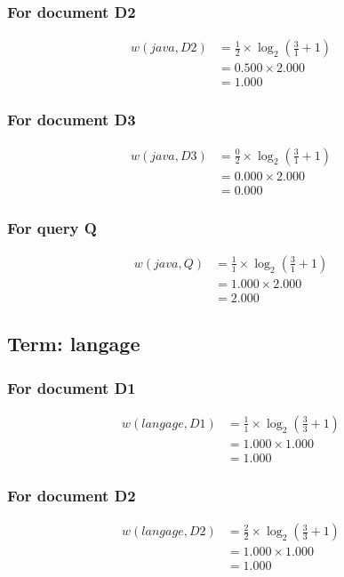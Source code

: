 \documentclass{article}
\begin{document}
\subsubsection*{For document D2}
\begin{align}
w(java, D2) &= \frac{1}{2} \times \log_{2}\left(\frac{3}{1} + 1\right) \\
&= 0.500 \times 2.000 \\
&= 1.000
\end{align}

\subsubsection*{For document D3}
\begin{align}
w(java, D3) &= \frac{0}{2} \times \log_{2}\left(\frac{3}{1} + 1\right) \\
&= 0.000 \times 2.000 \\
&= 0.000
\end{align}

\subsubsection*{For query Q}
\begin{align}
w(java, Q) &= \frac{1}{1} \times \log_{2}\left(\frac{3}{1} + 1\right) \\
&= 1.000 \times 2.000 \\
&= 2.000
\end{align}

\subsection{Term: langage}
\subsubsection*{For document D1}
\begin{align}
w(langage, D1) &= \frac{1}{1} \times \log_{2}\left(\frac{3}{3} + 1\right) \\
&= 1.000 \times 1.000 \\
&= 1.000
\end{align}

\subsubsection*{For document D2}
\begin{align}
w(langage, D2) &= \frac{2}{2} \times \log_{2}\left(\frac{3}{3} + 1\right) \\
&= 1.000 \times 1.000 \\
&= 1.000
\end{align}
\end{document}
